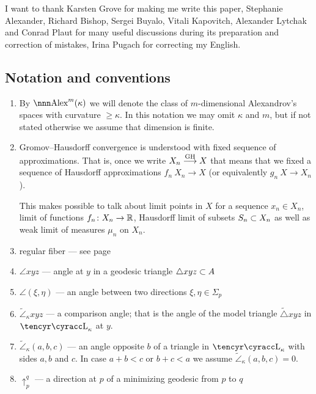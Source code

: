 \documentclass{article}
\begin{document}
I want to thank Karsten Grove for making me write this paper, Stephanie Alexander, Richard Bishop, Sergei Buyalo, Vitali Kapovitch, Alexander Lytchak and Conrad Plaut for many useful discussions during its preparation and correction of mistakes, Irina Pugach for correcting my English.



\tableofcontents


\subsection{Notation and conventions}
\begin{enumerate}[$\diamond$]
\item By $\Alex^m(\kappa)$ we will denote the class of $m$-dimensional Alexandrov's spaces with curvature $\ge \kappa$. 
In this notation we may omit $\kappa$ and $m$, but if not stated otherwise we assume that dimension is finite.

\item Gromov--Hausdorff convergence is understood with fixed sequence of approximations. 
That is, 
once we write $X_n\GHto X$ that means that we fixed a sequence of Hausdorff approximations $f_n\:X_n\to X$ (or equivalently $g_n\:X\to X_n$).

This makes possible to talk about limit points in $X$ for a sequence $x_n\in X_n$, limit of functions $f_n\colon X_n\to \mathbb{R}$, Hausdorff limit of subsets $S_n\subset X_n$ as well as weak limit of measures $\mu_n$ on $X_n$.

\item regular fiber --- see page~\pageref{reg-fib}

\item $\angle x y z$ --- angle at $y$ in a geodesic triangle $\triangle x y z\subset A$

\item $\angle(\xi,\eta)$ --- an angle between two directions $\xi,\eta\in \Sigma_p$

\item $\tilde\angle_\kappa x y z$ --- a comparison angle; 
that is the angle of the model
triangle $\tilde\triangle x y z$ in $\Lob_\kappa$ at $y$.

\item $\tilde\angle_\kappa(a,b,c)$ --- an angle opposite $b$ of a triangle in $\Lob_\kappa$ with sides $a,b$ and $c$. 
In case $a+b<c$ or $b+c<a$ we assume $\tilde\angle_\kappa(a,b,c)=0$.

\item $\uparrow_p^q$ --- a direction at $p$ of a minimizing geodesic from $p$ to $q$ 


\end{enumerate}
\end{document}
